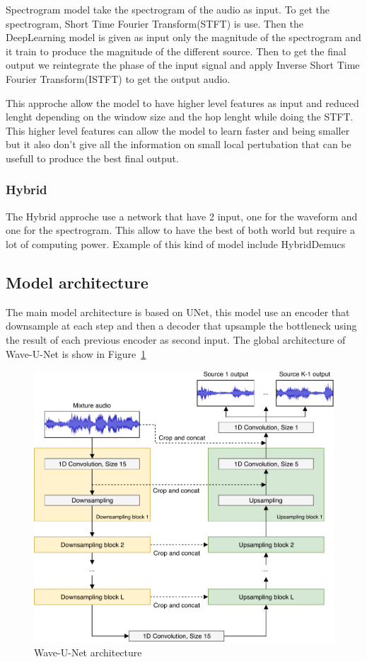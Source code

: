 \documentclass[final]{cvpr}
\begin{document}
Spectrogram model take the spectrogram of the audio as input.
To get the spectrogram, Short Time Fourier Transform(STFT) is use.
Then the DeepLearning model is given as input only the magnitude of the spectrogram and it train to produce the magnitude of the different source.
Then to get the final output we reintegrate the phase of the input signal and apply Inverse Short Time Fourier Transform(ISTFT) to get the output audio.

This approche allow the model to have higher level features as input and reduced lenght depending on the window size and the hop lenght while doing the STFT.
This higher level features can allow the model to learn faster and being smaller but it also don't give all the information on small local pertubation that can be usefull to produce the best final output.



\subsubsection{Hybrid}
The Hybrid approche use a network that have 2 input, one for the waveform and one for the spectrogram.
This allow to have the best of both world but require a lot of computing power. Example of this kind of model include HybridDemucs \cite{hybrid-demucs}

\subsection{Model architecture}

The main model architecture is based on UNet, this model use an encoder that downsample at each step and then a decoder that upsample the bottleneck using the result of each previous encoder as second input.
The global architecture of Wave-U-Net\cite{waveunet} is show in Figure~\ref{waveunet-architecture}

\begin{figure}
   \includegraphics[scale=0.25]{waveunet.png}
   \caption{Wave-U-Net architecture}
   \label{waveunet-architecture}
\end{figure}

{\small


}
\end{document}
